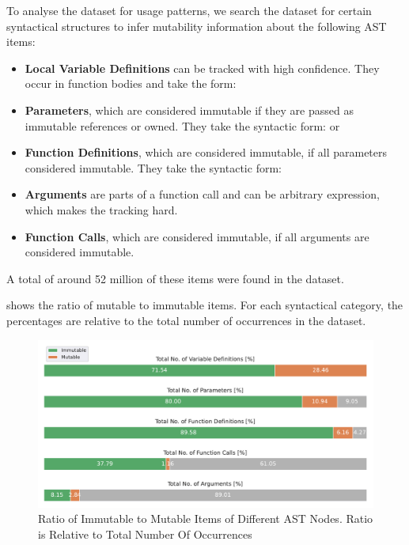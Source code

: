 \documentclass[twoside, english]{sdqthesis}
\theoremstyle{definition}
\begin{document}
To analyse the dataset for usage patterns, we search the dataset for certain syntactical structures to infer mutability information about the following AST items:
\begin{itemize}
	\item \textbf{Local Variable Definitions} can be tracked with high confidence. They occur in function bodies and take the form: 
	\item \textbf{Parameters}, which are considered immutable if they are passed as immutable references or owned. They take the syntactic form:  or 
	\item \textbf{Function Definitions}, which are considered immutable, if all parameters considered immutable. They take the syntactic form: 
	\item \textbf{Arguments} are parts of a function call and can be arbitrary expression, which makes the tracking hard.
	\item \textbf{Function Calls}, which are considered immutable, if all arguments are considered immutable.
\end{itemize}

A total of around 52 million of these items were found in the dataset.

 shows the ratio of mutable to immutable items. For each syntactical category, the percentages are relative to the total number of occurrences in the dataset.


\begin{figure}[h]
	\centering
	\includegraphics[width=0.9\linewidth, clip, trim={0.5cm 0.5cm 0.5cm 0.5cm}]{../mutability_by_category.pdf}
	\caption{Ratio of Immutable to Mutable Items of Different AST Nodes. Ratio is Relative to Total Number Of Occurrences}
	\label{fig:mutabillity_percentages}
\end{figure}
\end{document}
